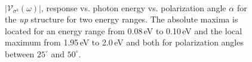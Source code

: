 \documentclass[prb,11pt,tightenlines,twocolumn,aps]{revtex4-1}
\begin{document}
\begin{figure}[t]
    \centering
    \\

    \caption{$|\mathcal{V}_{\sigma^{\mathrm{z}}}(\omega)|$, response
    vs. photon energy vs. polarization angle $\alpha$ for the \emph{up}
    structure for two energy ranges. The absolute maxima is located for an
    energy range from 0.08\,eV to 0.10\,eV and the local maximum from 1.95\,eV
    to 2.0\,eV and both for polarization angles between $25^{\circ}$ and
    $50^{\circ}$.}
    \label{fig:up-3d-vsz}   
\end{figure}
\end{document}
